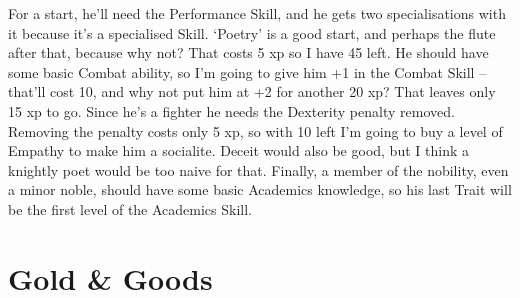 \begin{multicols}{2}
{\begin{exampletext}
For a start, he'll need the Performance Skill, and he gets two specialisations with it because it's a specialised Skill.
`Poetry' is a good start, and perhaps the flute after that, because why not? That costs 5 \gls{xp} so I have 45 left.
He should have some basic Combat ability, so I'm going to give him +1 in the Combat Skill -- that'll cost 10, and why not put him at +2 for another 20 \gls{xp}? That leaves only 15 \gls{xp} to go.
Since he's a fighter he needs the Dexterity penalty removed.
Removing the penalty costs only 5 \gls{xp}, so with 10 left I'm going to buy a level of Empathy to make him a socialite.
Deceit would also be good, but I think a knightly poet would be too naive for that.
Finally, a member of the nobility, even a minor noble, should have some basic Academics knowledge, so his last Trait will be the first level of the Academics Skill.

\end{exampletext}

}{}

\end{multicols}

\section{Gold \& Goods}\label{goods}

